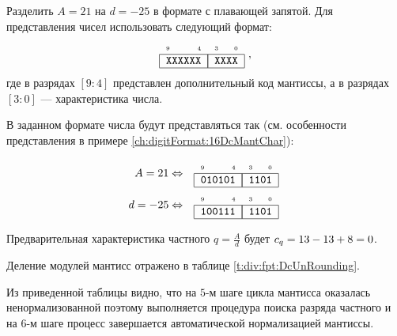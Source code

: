 \begin{Example}
    Разделить $A=21$ на $d=-25$ в формате с плавающей запятой. Для представления чисел использовать следующий формат:
    \[\FloatMyDcCharX{XXXXXX}{XXXX},\]
    где в разрядах $[9:4]$ представлен дополнительный код мантиссы, а в разрядах $[3:0]$ --- характеристика числа.
\end{Example}
\begin{Solve}
    В заданном формате числа будут представляться так (см. особенности представления в примере \ref{ch:digitFormat:16DcMantChar}):
    
    \begin{align*}
        A=21  & \Leftrightarrow & \FloatMyDcCharX{010101}{1101}\\
        d=-25 & \Leftrightarrow & \FloatMyDcCharX{100111}{1101}
    \end{align*}
    
    Предварительная характеристика частного $q=\frac{A}{d}$ будет $c_{q}=13-13+8=0$.
    
    Деление модулей мантисс отражено в таблице \ref{t:div:fpt:DcUnRounding}.
    
    Из приведенной таблицы видно, что на $5$-м шаге цикла мантисса оказалась ненормализованной поэтому выполняется процедура поиска разряда частного и на $6$-м шаге процесс завершается автоматической нормализацией мантиссы.
    

\end{Solve}
